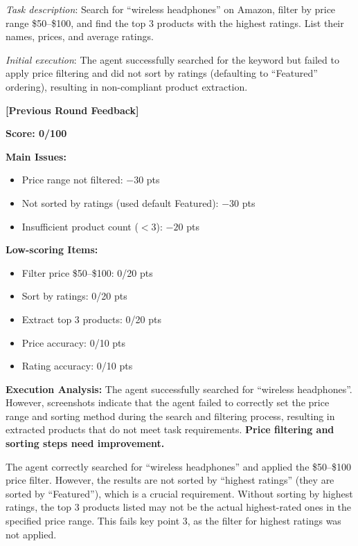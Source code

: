 \textit{Task description}: Search for ``wireless headphones'' on Amazon, filter by price range \$50--\$100, and find the top 3 products with the highest ratings. List their names, prices, and average ratings.

\textit{Initial execution}: The agent successfully searched for the keyword but failed to apply price filtering and did not sort by ratings (defaulting to ``Featured'' ordering), resulting in non-compliant product extraction.

\begin{tcolorbox}[
  title={LexJudge Feedback (Score: $0 \rightarrow 100$, task recovered)},
  colback=white,
  colframe=tableblueTitle,
  colbacktitle=tableblueTitle,
  coltitle=white,
  fonttitle=\bfseries,
  breakable,
  enhanced,
  boxrule=1.2pt,
  arc=1.5mm
]
\small
\textbf{[Previous Round Feedback]}

\textbf{Score: 0/100}

\textbf{Main Issues:}
\begin{itemize}[leftmargin=*, nosep]
    \item Price range not filtered: $-30$ pts
    \item Not sorted by ratings (used default Featured): $-30$ pts
    \item Insufficient product count ($<3$): $-20$ pts
\end{itemize}

\textbf{Low-scoring Items:}
\begin{itemize}[leftmargin=*, nosep]
    \item Filter price \$50--\$100: 0/20 pts
    \item Sort by ratings: 0/20 pts
    \item Extract top 3 products: 0/20 pts
    \item Price accuracy: 0/10 pts
    \item Rating accuracy: 0/10 pts
\end{itemize}

\textbf{Execution Analysis:}
The agent successfully searched for ``wireless headphones''. However, screenshots indicate that the agent failed to correctly set the price range and sorting method during the search and filtering process, resulting in extracted products that do not meet task requirements. \textbf{Price filtering and sorting steps need improvement.}
\end{tcolorbox}

\begin{tcolorbox}[
  title={WebJudge Feedback},
  colback=white,
  colframe=gray,
  colbacktitle=gray,
  coltitle=white,
  fonttitle=\bfseries,
  breakable,
  enhanced,
  boxrule=1.2pt,
  arc=1.5mm
]
\small
The agent correctly searched for ``wireless headphones'' and applied the \$50--\$100 price filter. However, the results are not sorted by ``highest ratings'' (they are sorted by ``Featured''), which is a crucial requirement. Without sorting by highest ratings, the top 3 products listed may not be the actual highest-rated ones in the specified price range. This fails key point 3, as the filter for highest ratings was not applied.
\end{tcolorbox}

